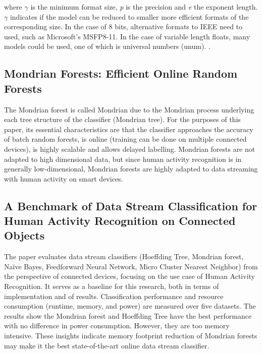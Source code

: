 \documentclass[conference]{IEEEtran}
\newcommand{\Yohan}[1]{\todo[inline,backgroundcolor=green]{YC: #1}}
\begin{document}
where $\gamma$ is the minimum format size, \textit{p} is the precision and
\textit{e} the exponent length. $\gamma$ indicates if the model can be reduced
to smaller more efficient formats of the corresponding size.
\cite{chatelain2019automatic} In the case of 8 bits, alternative formats to IEEE
need to used, such as Microsoft’s MSFP8-11. \cite{chung2018serving} In the case
of variable length floats, many models could be used, one of which is universal
numbers (unum). \cite{gustafson2017beating}.

\subsection{Mondrian Forests: Efficient Online Random Forests}

The Mondrian forest is called Mondrian due to the Mondrian process underlying
each tree structure of the classifier (Mondrian tree). For the purposes of this
paper, its essential characteristics are that the classifier approaches the
accuracy of batch random forests, is online (training can be done on multiple
connected devices), is highly scalable and allows delayed labelling. \cite{b1}
\Yohan{Reference is missing.}
Mondrian forests are not adapted to high dimensional data, but since human
activity recognition is in generally low-dimensional, Mondrian forests are
highly adapted to data streaming with human activity on smart devices.

\subsection{A Benchmark of Data Stream Classification for Human Activity Recognition on Connected Objects}

The paper \cite{khannouz2020benchmark} evaluates data stream classifiers
(Hoeffding Tree, Mondrian forest, Naïve Bayes, Feedforward Neural Network, Micro
Cluster Nearest Neighbor) from the perspective of connected devices, focusing on
the use case of Human Activity Recognition. It serves as a baseline for this
research, both in terms of implementation and of results.  Classification
performance and resource consumption (runtime, memory, and power) are measured
over five datasets. The results show the Mondrian forest and Hoeffding Tree have
the best performance with no difference in power consumption. However, they are
too memory intensive. These insights indicate memory footprint reduction of
Mondrian forests may make it the best state-of-the-art online data stream
classifier.
\end{document}
